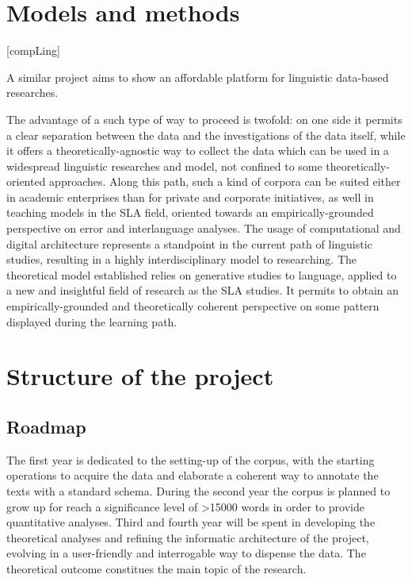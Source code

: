 \documentclass[a4paper,twoside,11pt,chapterprefix=false,bibliography=totocnumbered]{scrbook}
\theoremstyle{definition}
\theoremstyle{definition}
\theoremstyle{definition}
\theoremstyle{remark}
\begin{document}
\section{Models and methods}\label{models-and-methods}

{[}compLing{]}

A similar project aims to show an affordable platform for linguistic
data-based researches.

The advantage of a such type of way to proceed is twofold: on one side
it permits a clear separation between the data and the investigations of
the data itself, while it offers a theoretically-agnostic way to collect
the data which can be used in a widespread linguistic researches and
model, not confined to some theoretically-oriented approaches. Along
this path, such a kind of corpora can be suited either in academic
enterprises than for private and corporate initiatives, as well in
teaching models in the SLA field, oriented towards an
empirically-grounded perspective on error and interlanguage analyses.
The usage of computational and digital architecture
\citep[\citet{kurdi_natural_2016-2},
\citet{kuebler-corpus_linguistics}]{clark_handbook_2010-1} represents a
standpoint in the current path of linguistic studies, resulting in a
highly interdisciplinary model to researching. The theoretical model
established relies on generative studies to language, applied to a new
and insightful field of research as the SLA studies. It permits to
obtain an empirically-grounded and theoretically coherent perspective on
some pattern displayed during the learning path.

\section{Structure of the project}\label{structure-of-the-project}

\subsection{Roadmap}\label{roadmap}

The first year is dedicated to the setting-up of the corpus, with the
starting operations to acquire the data and elaborate a coherent way to
annotate the texts with a standard schema. During the second year the
corpus is planned to grow up for reach a significance level of
\textgreater{}15000 words in order to provide quantitative analyses.
Third and fourth year will be spent in developing the theoretical
analyses and refining the informatic architecture of the project,
evolving in a user-friendly and interrogable way to dispense the data.
The theoretical outcome constitues the main topic of the research.
\end{document}
